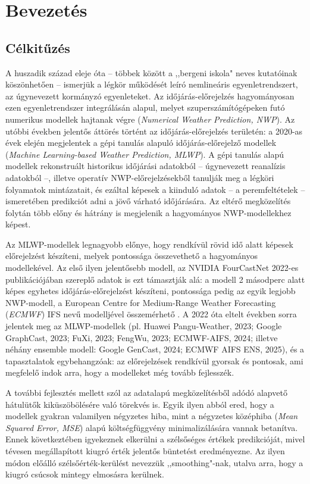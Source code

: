 \documentclass[12pt,a4paper]{article}
\begin{document}
\tableofcontents
\newpage

\section{Bevezetés}

\subsection{Célkitűzés}
A huszadik század eleje óta -- többek között a ,,bergeni iskola" neves kutatóinak köszönhetően -- ismerjük a légkör működését leíró nemlineáris egyenletrendszert, az úgynevezett kormányzó egyenleteket. Az időjárás-előrejelzés hagyományosan ezen egyenletrendszer integrálásán alapul, melyet szuperszámítógépeken futó numerikus modellek hajtanak végre (\textit{Numerical Weather Prediction, NWP}). Az utóbbi években jelentős áttörés történt az időjárás-előrejelzés területén: a 2020-as évek elején megjelentek a gépi tanulás alapuló időjárás-előrejelző modellek (\textit{Machine Learning-based Weather Prediction, MLWP}). A gépi tanulás alapú modellek rekonstruált historikus időjárási adatokból -- úgynevezett reanalízis adatokból --, illetve operatív NWP-előrejelzésekből tanulják meg a légköri folyamatok mintázatait, és ezáltal képesek a kiinduló adatok -- a peremfeltételek -- ismeretében predikciót adni a jövő várható időjárására. Az eltérő megközelítés folytán több előny és hátrány is megjelenik a hagyományos NWP-modellekhez képest.

Az MLWP-modellek legnagyobb előnye, hogy rendkívül rövid idő alatt képesek előrejelzést készíteni, melyek pontossága összevethető a hagyományos modellekével. Az első ilyen jelentősebb modell, az NVIDIA FourCastNet 2022-es publikációjában szereplő adatok is ezt támasztják alá: a modell 2 másodperc alatt képes egyhetes időjárás-előrejelzést készíteni, pontossága pedig az egyik legjobb NWP-modell, a European Centre for Medium-Range Weather Forecasting (\textit{ECMWF}) IFS nevű modelljével összemérhető \cite{pathak_fourcastnet_2022}. A 2022 óta eltelt években sorra jelentek meg az MLWP-modellek (pl. Huawei Pangu-Weather, 2023; Google GraphCast, 2023; FuXi, 2023; FengWu, 2023; ECMWF-AIFS, 2024; illetve néhány ensemble modell: Google GenCast, 2024; ECMWF AIFS ENS, 2025), és a tapasztalatok egybehangzóak: az előrejelzések rendkívül gyorsak és pontosak, ami megfelelő indok arra, hogy a modelleket még tovább fejlesszék.


A további fejlesztés mellett szól az adatalapú megközelítésből adódó alapvető hátulütők kiküszöbölésére való törekvés is. Egyik ilyen abból ered, hogy a modellek gyakran valamilyen négyzetes hiba, mint a négyzetes középhiba (\textit{Mean Squared Error, MSE}) alapú költségfüggvény minimalizálására vannak betanítva. Ennek következtében igyekeznek elkerülni a szélsőséges értékek predikcióját, mivel tévesen megállapított kiugró érték jelentős büntetést eredményezne. Az ilyen módon előálló szélsőérték-kerülést nevezzük ,,smoothing"-nak, utalva arra, hogy a kiugró csúcsok mintegy elmosásra kerülnek. 
\end{document}
